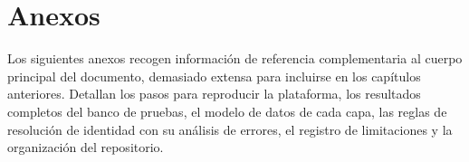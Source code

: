 \documentclass[12pt, a4paper]{book}
\begin{document}
\cleardoublepage
\chapter*{Anexos}

Los siguientes anexos recogen información de referencia complementaria al
cuerpo principal del documento, demasiado extensa para incluirse en los
capítulos anteriores. Detallan los pasos para reproducir la plataforma, los
resultados completos del banco de pruebas, el modelo de datos de cada capa,
las reglas de resolución de identidad con su análisis de errores, el registro
de limitaciones y la organización del repositorio.







\end{document}

